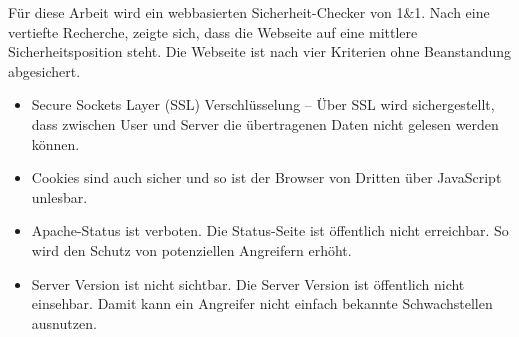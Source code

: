 Für diese Arbeit wird ein webbasierten Sicherheit-Checker von 1\&1. Nach eine vertiefte Recherche, zeigte sich, dass die Webseite auf eine mittlere Sicherheitsposition steht. Die Webseite ist nach vier Kriterien ohne Beanstandung abgesichert.

\begin{itemize}	
	
\item Secure Sockets Layer (SSL) Verschlüsselung – Über SSL wird sichergestellt, dass zwischen User und Server die übertragenen Daten nicht gelesen werden können.

\item Cookies sind auch sicher und so ist der Browser von Dritten über JavaScript unlesbar.

\item Apache-Status ist verboten. Die Status-Seite ist öffentlich nicht erreichbar. So wird den Schutz von potenziellen Angreifern erhöht. 

\item Server Version ist nicht sichtbar. Die Server Version ist öffentlich nicht einsehbar. Damit kann ein Angreifer nicht einfach bekannte Schwachstellen ausnutzen.

\end{itemize}

